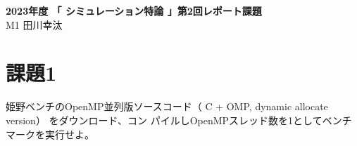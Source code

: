 \documentclass[]{jarticle}          %
\begin{document}

\vspace*{2ex}
\begin{center}
 {\Large \bf 2023年度 「 シミュレーション特論 」第2回レポート課題}\\ %
 \vspace*{5mm}
 {\large M1 田川幸汰}%
\end{center}






\section{課題1}
姫野ベンチのOpenMP並列版ソースコード（ C + OMP, dynamic allocate version） をダウンロード、コン
パイルしOpenMPスレッド数を1としてベンチマークを実行せよ。
\end{document}
